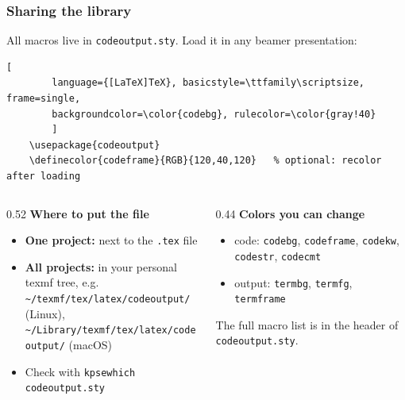 \documentclass[aspectratio=169,10pt,compress]{beamer}
\newcommand{\cmd}[1]{\texttt{\color{gitred}#1}}
\begin{document}
\begin{frame}[t,fragile] \frametitle{Sharing the library}
  All macros live in \texttt{codeoutput.sty}. Load it in any beamer presentation:


\begin{lstlisting}[
		language={[LaTeX]TeX}, basicstyle=\ttfamily\scriptsize, frame=single,
		backgroundcolor=\color{codebg}, rulecolor=\color{gray!40}
		]
	\usepackage{codeoutput}
	\definecolor{codeframe}{RGB}{120,40,120}   % optional: recolor after loading
\end{lstlisting}


  \begin{columns}[T]
    \begin{column}{0.52\textwidth}
      \textbf{Where to put the file}
      \begin{itemize}\small
        \item \textbf{One project:} next to the \texttt{.tex} file
        \item \textbf{All projects:} in your personal texmf tree, e.g.\\
              \texttt{\textasciitilde/texmf/tex/latex/codeoutput/} (Linux),\\
              \texttt{\textasciitilde/Library/texmf/tex/latex/codeoutput/} (macOS)
        \item Check with \cmd{kpsewhich codeoutput.sty}
      \end{itemize}
    \end{column}
    \begin{column}{0.44\textwidth}
      \textbf{Colors you can change}
      \begin{itemize}\small
        \item code: \texttt{codebg}, \texttt{codeframe}, \texttt{codekw}, \texttt{codestr}, \texttt{codecmt}
        \item output: \texttt{termbg}, \texttt{termfg}, \texttt{termframe}
      \end{itemize}
      \small The full macro list is in the header of \texttt{codeoutput.sty}.
    \end{column}
  \end{columns}
\end{frame}

\end{document}
